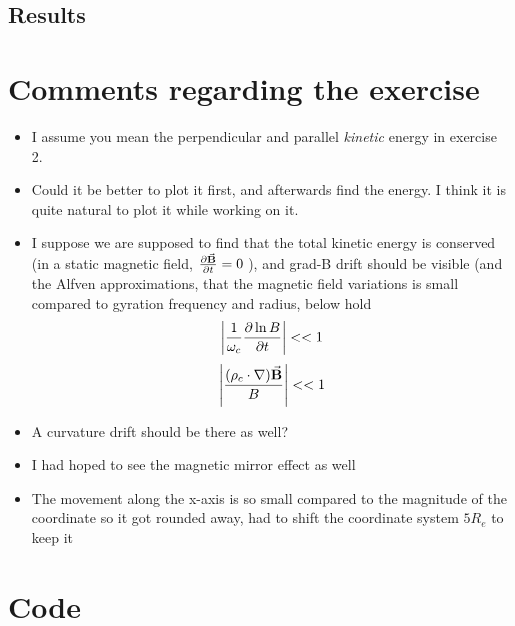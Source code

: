 \documentclass[x11names]{article}
\begin{document}
\subsection{Results}

      

\appendix
\section{Comments regarding the exercise}
      \begin{itemize}
            \item I assume you mean the perpendicular and parallel \textit{kinetic} energy in exercise 2.
            \item Could it be better to plot it first, and afterwards find the energy. I think it is quite natural to plot it while working on it.
            \item I suppose we are supposed to find that the total kinetic energy is conserved (in a static magnetic field, \(\pdv{\va{B}}{t} = 0\) ), and grad-B drift should be visible (and the Alfven approximations, that the magnetic field variations is small compared to gyration frequency and radius, below hold
            \[ \left|\frac{1}{\omega_c} \pdv{\ln{B}}{t}\right| << 1 \] 
            \[ \left| \frac{(\rho_c \cdot \nabla)\va{B}}{B} \right| << 1 \] 
            \item A curvature drift should be there as well?
            \item I had hoped to see the magnetic mirror effect as well
            \item The movement along the x-axis is so small compared to the magnitude of the coordinate so it got rounded away, had to shift the coordinate system \(5R_e\) to keep it
      \end{itemize}


\section{Code}
      
\end{document}
